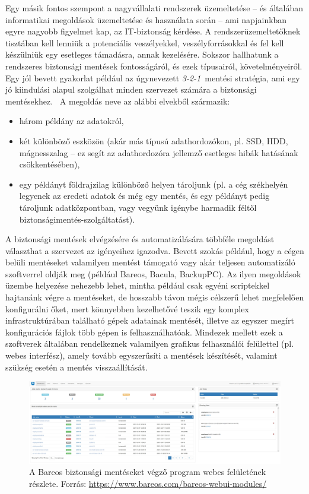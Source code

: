 Egy másik fontos szempont a nagyvállalati rendszerek üzemeltetése -- és általában informatikai megoldások üzemeltetése és használata során -- ami napjainkban egyre nagyobb figyelmet kap, az IT-biztonság kérdése. A rendszerüzemeltetőknek tisztában kell lenniük a potenciális veszélyekkel, veszélyforrásokkal és fel kell készülniük egy esetleges támadásra, annak kezelésére. Sokszor hallhatunk a rendszeres biztonsági mentések fontosságáról, és ezek típusairól, követelményeiről. Egy jól bevett gyakorlat például az úgynevezett \textit{\mbox{3-2-1}}~mentési stratégia, ami egy jó kiindulási alapul szolgálhat minden szervezet számára a biztonsági mentésekhez.~\cite{Backblaze321}
A megoldás neve az alábbi elvekből származik:~\cite{Seagate321}
\begin{itemize}
	\item három példány az adatokról,
	\item két különböző eszközön (akár más típusú adathordozókon, pl. SSD, HDD, mágnesszalag -- ez segít az adathordozóra jellemző esetleges hibák hatásának csökkentésében),
	\item egy példányt földrajzilag különböző helyen tároljunk (pl. a cég székhelyén legyenek az eredeti adatok és még egy mentés, és egy példányt pedig tároljunk adatközpontban, vagy vegyünk igénybe harmadik féltől biztonságimentés-szolgáltatást).
\end{itemize}

A biztonsági mentések elvégzésére és automatizálására többféle megoldást választhat a szervezet az igényeihez igazodva. Bevett szokás például, hogy a cégen belüli mentéseket valamilyen mentést támogató vagy akár teljesen automatizáló szoftverrel oldják meg (például Bareos, Bacula, BackupPC). Az ilyen megoldások üzembe helyezése nehezebb lehet, mintha például csak egyéni scriptekkel hajtanánk végre a mentéseket, de hosszabb távon mégis célszerű lehet megfelelően konfigurálni őket, mert könnyebben kezelhetővé teszik egy komplex infrastruktúrában található gépek adatainak mentését, illetve az egyszer megírt konfigurációs fájlok több gépen is felhasználhatóak. Mindezek mellett ezek a szoftverek általában rendelkeznek valamilyen grafikus felhasználói felülettel (pl. webes interfész), amely tovább egyszerűsíti a mentések készítését, valamint szükség esetén a mentés visszaállítását.

\begin{figure}[!ht]
	\centering
	\includegraphics[width=150mm, keepaspectratio]{figures/bareos-dashboard.png}
	\caption{A Bareos biztonsági mentéseket végző program webes felületének részlete. Forrás: \url{https://www.bareos.com/bareos-webui-modules/}}
	\label{fig:bareos}
\end{figure}

